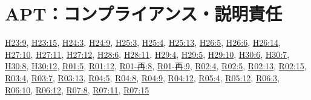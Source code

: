 \section{APT：コンプライアンス・説明責任}
\hyperref[q:h23-reg-apt-09]{H23:9}, \hyperref[q:h23-reg-apt-15]{H23:15}, \hyperref[q:h24-reg-apt-03]{H24:3}, \hyperref[q:h24-reg-apt-09]{H24:9}, \hyperref[q:h25-reg-apt-03]{H25:3}, \hyperref[q:h25-reg-apt-04]{H25:4}, \hyperref[q:h25-reg-apt-13]{H25:13}, \hyperref[q:h26-reg-apt-05]{H26:5}, \hyperref[q:h26-reg-apt-06]{H26:6}, \hyperref[q:h26-reg-apt-14]{H26:14}, \hyperref[q:h27-reg-apt-10]{H27:10}, \hyperref[q:h27-reg-apt-11]{H27:11}, \hyperref[q:h27-reg-apt-12]{H27:12}, \hyperref[q:h28-reg-apt-06]{H28:6}, \hyperref[q:h28-reg-apt-11]{H28:11}, \hyperref[q:h29-reg-apt-04]{H29:4}, \hyperref[q:h29-reg-apt-05]{H29:5}, \hyperref[q:h29-reg-apt-10]{H29:10}, \hyperref[q:h30-reg-apt-06]{H30:6}, \hyperref[q:h30-reg-apt-07]{H30:7}, \hyperref[q:h30-reg-apt-08]{H30:8}, \hyperref[q:h30-reg-apt-12]{H30:12}, \hyperref[q:r01-reg-apt-05]{R01:5}, \hyperref[q:r01-reg-apt-12]{R01:12}, \hyperref[q:r01-ret-apt-08]{R01-再:8}, \hyperref[q:r01-ret-apt-09]{R01-再:9}, \hyperref[q:r02-reg-apt-04]{R02:4}, \hyperref[q:r02-reg-apt-05]{R02:5}, \hyperref[q:r02-reg-apt-13]{R02:13}, \hyperref[q:r02-reg-apt-15]{R02:15}, \hyperref[q:r03-reg-apt-04]{R03:4}, \hyperref[q:r03-reg-apt-07]{R03:7}, \hyperref[q:r03-reg-apt-13]{R03:13}, \hyperref[q:r04-reg-apt-05]{R04:5}, \hyperref[q:r04-reg-apt-08]{R04:8}, \hyperref[q:r04-reg-apt-09]{R04:9}, \hyperref[q:r04-reg-apt-12]{R04:12}, \hyperref[q:r05-reg-apt-04]{R05:4}, \hyperref[q:r05-reg-apt-12]{R05:12}, \hyperref[q:r06-reg-apt-03]{R06:3}, \hyperref[q:r06-reg-apt-10]{R06:10}, \hyperref[q:r06-reg-apt-12]{R06:12}, \hyperref[q:r07-reg-apt-08]{R07:8}, \hyperref[q:r07-reg-apt-11]{R07:11}, \hyperref[q:r07-reg-apt-15]{R07:15}
